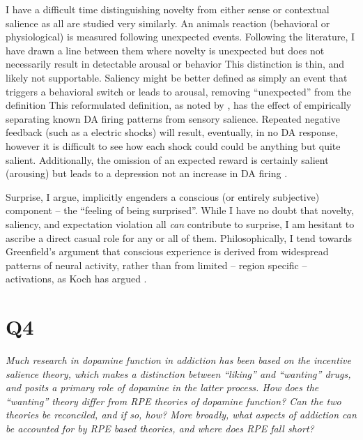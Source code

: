 \documentclass[doc]{apa}        %
\begin{document}
I have a difficult time distinguishing novelty from either sense or contextual salience as all are studied very similarly. An animals reaction (behavioral or physiological) is measured following unexpected events.  Following the literature, I have drawn a line between them where novelty is unexpected but does not necessarily result in detectable arousal or behavior  This distinction is thin, and likely not supportable.  Saliency might be better defined as simply an event that triggers a behavioral switch or leads to arousal, removing ``unexpected'' from the definition  This reformulated definition, as noted by , has the effect of empirically separating known DA firing patterns from sensory salience.  Repeated negative feedback (such as a electric shocks) will result, eventually, in no DA response, however it is difficult to see how each shock could could be anything but quite salient.  Additionally, the omission of an expected reward is certainly salient (arousing) but leads to a depression not an increase in DA firing \cite{ODoherty:2004p2581,Fiorillo:2003p6375}.  
 
Surprise, I argue, implicitly engenders a conscious (or entirely subjective) component -- the ``feeling of being surprised''.  While I have no doubt that novelty, saliency, and expectation violation all \emph{can} contribute to surprise, I am hesitant to ascribe a direct casual role for any or all of them.  Philosophically, I tend towards Greenfield's argument that conscious experience is derived from widespread patterns of neural activity, rather than from limited -- region specific -- activations, as Koch has argued \cite{Koch:2007p7251}.  
  

\newpage
\section{Q4} %
\label{sec:q4}
\emph{Much research in dopamine function in addiction has been based on the incentive salience theory, which makes a distinction between “liking” and “wanting” drugs, and posits a primary role of dopamine in the latter process.  How does the “wanting” theory differ from RPE theories of dopamine function?  Can the two theories be reconciled, and if so, how?  More broadly, what aspects of addiction can be accounted for by RPE based theories, and where does RPE fall short?}
\end{document}
